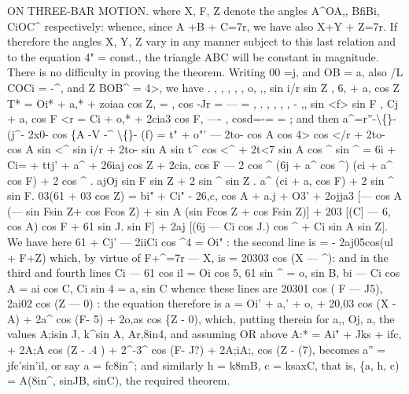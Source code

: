 \documentclass[11pt,a4paper]{book}
\begin{document}
ON THREE-BAR MOTION.
where X,
F, Z
denote
the
angles
A\textasciicircum{}OA,,
BfiBi,
CiOC\textasciicircum{}
respectively:
whence,
since
A +B + C=7r, we
have
also X+Y + Z=7r.
If
therefore
the
angles X,
Y, Z vary
in
any
manner
subject
to
this
last
relation and
to
the equation
4" = const., the triangle
ABC
will be
constant
in
magnitude.
There
is
no
difficulty
in proving the
theorem.
Writing 00 =j, and OB = a, also
/L COCi = -\textasciicircum{}, and
Z BOB\textasciicircum{} = 4>, we have
.
, ,
,
,
,
o,
,,
sin i/r
sin Z
,
6, + a, cos Z
T* = Oi* + a,* + zoiaa cos Z,
=
,
cos -Jr = ---
=
,
.
,
,
,
, -
,,
sin
<f>
sin F
,
Cj + a, cos F
<r\guillemotright{} = Ci\guillemotright{} + o,* + 2cia3 cos F,
----
,
cosd\guillemotright{}=-=
=
;
and then
a\textasciicircum{}=r''-\textbackslash\{\}-(j\textasciicircum{}- 2x0- cos \{A -V -\textasciicircum{} \textbackslash\{\}- (f)
= t" + o"' --- 2to- cos A cos 4> cos \textbullet{}</r + 2to- cos A sin <\textasciicircum{} sin i/r
+ 2to- sin A sin t\textasciicircum{} cos <\textasciicircum{} + 2t<7 sin A cos \textasciicircum{} sin \textasciicircum{}
= 6i\guillemotright{} + Ci= + ttj' + a\textasciicircum{} + 26iaj cos Z + 2cia, cos F
--- 2 cos \textasciicircum{} (6j + a\textasciicircum{} cos \textasciicircum{}) (ci + a\textasciicircum{} cos F)
+ 2 cos \textasciicircum{}
. ajOj sin F sin Z
+ 2 sin \textasciicircum{} sin Z
. a\textasciicircum{} (ci + a, cos F)
+ 2 sin \textasciicircum{} sin F. 03(61 + 03 cos Z)
= bi" + Ci" - 26,c, cos A + a.j\guillemotright{} + O3'
+ 2ojja3 [--- cos A (--- sin Fsin Z+ cos Fcos Z)
+ sin A (sin Fcos Z + cos Fsin Z)]
+ 203 [(C] --- 6, cos A) cos F + 61 sin J. sin F]
+ 2aj [(6j --- Ci cos J.) cos \textasciicircum{} + Ci sin A sin Z].
We have
here
61\textdegree{} + Cj' --- 2i\guillemotright{}iCi cos \textasciicircum{}4 = Oi"
:
the second
line
is = - 2aj05cos(ul + F+Z)
which, by virtue
of F+\textasciicircum{}=7r --- X,
is = 20303 cos (X --- \textasciicircum{}):
and
in
the
third
and
fourth
lines
Ci --- 61 cos il = Oi cos 5,
61 sin \textasciicircum{} = o, sin B,
bi --- Ci cos A = ai cos C,
Ci sin 4 = a, sin C
whence
these
lines are
20301 cos ( F --- J5),
2ai02 cos (Z --- 0)
:
the equation
therefore
is
a\guillemotright{} = Oi' + a,' + o,\guillemotright{} + 20,03 cos (X -A) + 2a\textasciicircum{} cos (F- 5) + 2o,as cos \{Z - 0),
which,
putting
therein
for
a,,
Oj,
a,
the values
A;isin J, k\textasciicircum{}sin A, Ar,8in4, and assuming
OR above
A:* = Ai" + Jks\guillemotright{} + ifc,\guillemotright{} + 2A;A cos (Z - .4 ) + 2\textasciicircum{}-3\textasciicircum{} cos (F- J?) + 2A;iA;, cos (Z - (7),
becomes
a'' = jfc'sin'il,
or
say
a = fc8in\textasciicircum{};
and
similarly
h = k8mB,
c = ksaxC,
that
is,
\{a,
h,
c) = A(8in\textasciicircum{}, sinJB, sinC), the
required theorem.
\end{document}
